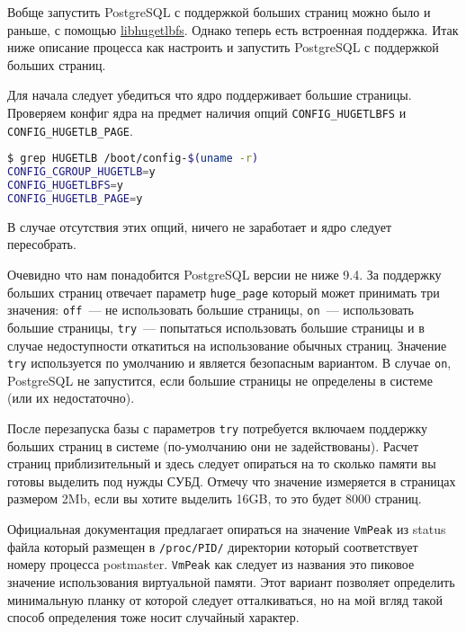 Вобще запустить PostgreSQL с поддержкой больших страниц можно было и раньше, с помощью \href{http://www.thislinux.org/2012/08/postgresql-with-hugepages.html}{libhugetlbfs}. Однако теперь есть встроенная поддержка. Итак ниже описание процесса как настроить и запустить PostgreSQL с поддержкой больших страниц.

Для начала следует убедиться что ядро поддерживает большие страницы. Проверяем конфиг ядра на предмет наличия опций \lstinline!CONFIG_HUGETLBFS! и \lstinline!CONFIG_HUGETLB_PAGE!.

\begin{lstlisting}[language=Bash,label=lst:settings_hugepages1,caption=Проверка конфига ядра на поддержку huge pages]
$ grep HUGETLB /boot/config-$(uname -r)
CONFIG_CGROUP_HUGETLB=y
CONFIG_HUGETLBFS=y
CONFIG_HUGETLB_PAGE=y
\end{lstlisting}

В случае отсутствия этих опций, ничего не заработает и ядро следует пересобрать.

Очевидно что нам понадобится PostgreSQL версии не ниже 9.4. За поддержку больших страниц отвечает параметр \lstinline!huge_page! который может принимать три значения: \lstinline!off!~--- не использовать большие страницы, \lstinline!on!~--- использовать большие страницы, \lstinline!try!~--- попытаться использовать большие страницы и в случае недоступности откатиться на использование обычных страниц. Значение \lstinline!try! используется по умолчанию и является безопасным вариантом. В случае \lstinline!on!, PostgreSQL не запустится, если большие страницы не определены в системе (или их недостаточно).

После перезапуска базы с параметров \lstinline!try! потребуется включаем поддержку больших страниц в системе (по-умолчанию они не задействованы). Расчет страниц приблизительный и здесь следует опираться на то сколько памяти вы готовы выделить под нужды СУБД. Отмечу что значение измеряется в страницах размером 2Mb, если вы хотите выделить 16GB, то это будет 8000 страниц.

Официальная документация предлагает опираться на значение \lstinline!VmPeak! из status файла который размещен в \lstinline!/proc/PID/! директории который соответствует номеру процесса postmaster. \lstinline!VmPeak! как следует из названия это пиковое значение использования виртуальной памяти. Этот вариант позволяет определить минимальную планку от которой следует отталкиваться, но на мой вгляд такой способ определения тоже носит случайный характер.

